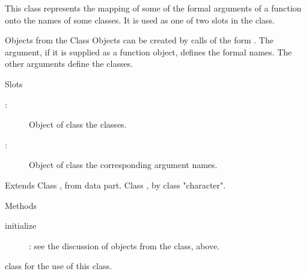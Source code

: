 %
\begin{Description}\relax
This class represents the mapping of some of the formal
arguments of a function onto the names of some classes.  It is used as
one of two slots in the  class.
\end{Description}
%
\begin{Section}{Objects from the Class}
Objects can be created by calls of the form .  The  argument, if it is
supplied as a function object, defines the formal names.  The other
arguments define the classes.
\end{Section}
%
\begin{Section}{Slots}
\begin{description}

\item[:] Object of class  the classes. 
\item[:] Object of class  the
corresponding argument names. 

\end{description}

\end{Section}
%
\begin{Section}{Extends}
Class , from data part.
Class , by class "character".
\end{Section}
%
\begin{Section}{Methods}
\begin{description}

\item[initialize] : see the
discussion of objects from the class, above. 

\end{description}

\end{Section}
%
\begin{SeeAlso}\relax
class  for the use of this class.
\end{SeeAlso}
